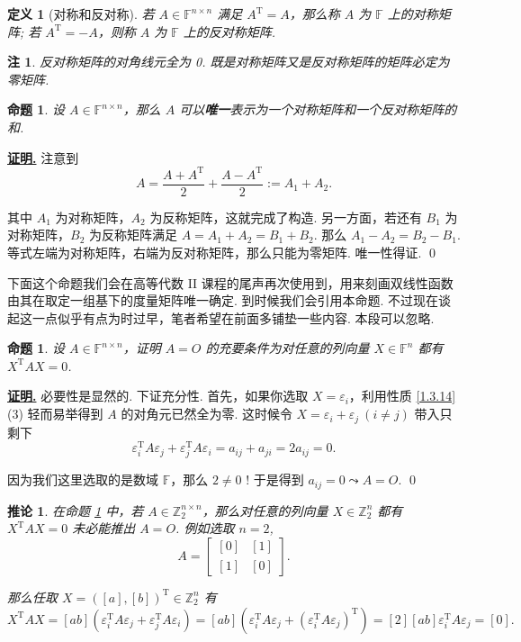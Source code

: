 \documentclass[10pt,openany]{article}
\theoremstyle{thmstyle} %
\theoremstyle{defstyle} %
\newtheorem{definition}[theorem]{定义}
\newtheorem{corollary}[theorem]{推论}
\theoremstyle{prostyle} %
\newtheorem{proposition}[theorem]{命题}
\theoremstyle{exastyle}
\theoremstyle{remstyle}
\newtheorem{remark}[theorem]{注}
\renewenvironment{proof}[1][证明]{\par\underline{\textbf{#1.}} \;\fangsong}{\qed\par}
\newcommand{\T}{^{\text{T}}}
\newcommand{\F}{\mathbb{F}}
\newcommand{\n}{^{n \times n}}
\begin{document}
\begin{definition}[对称和反对称]
	若 \( A \in \F^{n \times n} \) 满足 \( A\T=A \)，那么称 \( A \) 为 \( \F \) 上的对称矩阵; 若 \( A\T=-A \)，则称 \( A \) 为 \( \F \) 上的反对称矩阵.
\end{definition}

\begin{remark}
	反对称矩阵的对角线元全为 0. 既是对称矩阵又是反对称矩阵的矩阵必定为零矩阵.
\end{remark}

\begin{proposition}
	设 \( A \in \F^{n \times n} \)，那么 \( A \) 可以\textbf{唯一}表示为一个对称矩阵和一个反对称矩阵的和.
	\label{1.3.26}
\end{proposition}

\begin{proof}
	注意到
	\[ A=\frac{A+A\T}{2}+\frac{A-A\T}{2}:=A_1+A_2. \]
	
	其中 \( A_1 \) 为对称矩阵，\( A_2 \) 为反称矩阵，这就完成了构造. 另一方面，若还有 \( B_1 \) 为对称矩阵，\( B_2 \) 为反称矩阵满足 \( A=A_1+A_2=B_1+B_2 \). 那么 \( A_1-A_2=B_2-B_1 \). 等式左端为对称矩阵，右端为反对称矩阵，那么只能为零矩阵. 唯一性得证.
\end{proof}

\vspace{1ex}

下面这个命题我们会在高等代数 II 课程的尾声再次使用到，用来刻画双线性函数由其在取定一组基下的度量矩阵唯一确定. 到时候我们会引用本命题. 不过现在谈起这一点似乎有点为时过早，笔者希望在前面多铺垫一些内容. 本段可以忽略.

\begin{proposition}
	设 \( A \in \F\n \)，证明 \( A=O \) 的充要条件为对任意的列向量 \( X \in \F^n\) 都有 \( X\T AX=0 \).
	\label{1.3.27}
\end{proposition} 

\begin{proof}
	必要性是显然的. 下证充分性. 首先，如果你选取 \( X=\varepsilon_i \)，利用性质 \ref{1.3.14} (3) 轻而易举得到 \( A \) 的对角元已然全为零. 这时候令 \( X=\varepsilon_i+\varepsilon_j \ (i \neq j) \) 带入只剩下 
	\[ \varepsilon_i\T A \varepsilon_j+\varepsilon_j\T A \varepsilon_i= a_{ij}+a_{ji}=2a_{ij}=0. \]
	
	因为我们这里选取的是数域 \( \mathbb{F} \)，那么 \( 2 \neq 0 \) ! 于是得到 \( a_{ij}=0 \leadsto A=O \).
\end{proof}

\begin{corollary}
	在命题 \ref{1.3.27} 中，若 \( A \in \mathbb{Z}_2^{n \times n} \)，那么对任意的列向量 \( X \in \mathbb{Z}_2^n\) 都有 \( X\T AX=0 \) 未必能推出 \( A=O \). 例如选取 \( n=2 \),
	\[ A=\begin{bmatrix}
		[0] & [1] \\ [1] & [0]
	\end{bmatrix}. \]
	
	那么任取 \( X=([a],[b])\T \in \mathbb{Z}_2^n \) 有
	\[ X\T AX=[ab](\varepsilon_i\T A \varepsilon_j+\varepsilon_j\T A \varepsilon_i)=[ab](\varepsilon_i\T A \varepsilon_j+(\varepsilon_i\T A \varepsilon_j)\T)=[2][ab]\varepsilon_i\T A \varepsilon_j=[0]. \]
\end{corollary}
\end{document}
